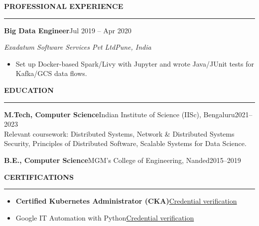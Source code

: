 \documentclass{resume} %
\def\sectionskip{\vspace{0.42em}}
\def\sectionlineskip{\vspace{0.12em}}
\newcommand{\pipe}{\hspace{0.35em}\textbar\hspace{0.35em}}
\renewenvironment{rSection}[1]{%
  \sectionskip
  \MakeUppercase{\textbf{#1}}%
  \sectionlineskip
  \hrule
  \begin{list}{}{%
    \setlength{\leftmargin}{0em}%
    \setlength{\topsep}{0.22em}%
    \setlength{\partopsep}{0pt}%
    \setlength{\parsep}{0pt}%
    \setlength{\itemsep}{0pt}%
  }%
  \item[]%
}{%
  \end{list}%
}
\newcommand{\role}[2]{\textbf{#1}\pipe #2\par\vspace{0.02em}}
\begin{document}
\begin{rSection}{Professional Experience}
\vspace{0.22em}
\role{Big Data Engineer}{Jul 2019 -- Apr 2020}
\textit{Exadatum Software Services Pvt Ltd\pipe Pune, India}

\begin{itemize}
    \item Set up Docker-based Spark/Livy with Jupyter and wrote Java/JUnit tests for Kafka/GCS data flows.
\end{itemize}

\end{rSection}

\begin{rSection}{Education}

\textbf{M.Tech, Computer Science}\pipe Indian Institute of Science (IISc), Bengaluru\pipe 2021--2023\\
Relevant coursework: Distributed Systems, Network \& Distributed Systems Security, Principles of Distributed Software, Scalable Systems for Data Science.

\vspace{0.2em}
\textbf{B.E., Computer Science}\pipe MGM's College of Engineering, Nanded\pipe 2015--2019

\end{rSection}

\begin{rSection}{Certifications}

\begin{itemize}
    \item \textbf{Certified Kubernetes Administrator (CKA)}\pipe \href{https://www.credly.com/badges/5e298069-3cc7-4a4b-b30c-79a8ae8f624f/public_url}{Credential verification}
    \item Google IT Automation with Python\pipe \href{https://www.credly.com/badges/75d9811c-198b-4dc5-a41d-dd3a6e6d9ee3/public_url}{Credential verification}
\end{itemize}

\end{rSection}
\end{document}
